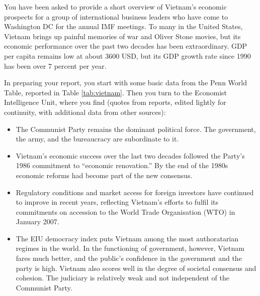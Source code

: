\documentclass[letterpaper,12pt]{exam}
\begin{document}
\begin{questions}
You have been asked to provide a short overview of Vietnam's economic prospects
for a group of international business leaders who have come to
Washington DC for the annual IMF meetings.
To many in the United States, Vietnam brings up painful memories of war and Oliver Stone movies,
but its economic performance over the past two decades has been extraordinary.
GDP per capita remains low at about 3600 USD,
but its GDP growth rate since 1990 has been over 7 percent per year.

In preparing your report,
you start with some basic data from the Penn World Table,
reported in Table \ref{tab:vietnam}.
Then you turn to the Economist Intelligence Unit,
where you find (quotes from reports, edited lightly for continuity,
with additional data from other sources):
\begin{itemize}
\item The Communist Party remains the dominant political force.
The government, the army, and the bureaucracy are subordinate to it.
\item Vietnam's economic success over the last two decades followed the Party's 1986
commitment to ``economic renovation.''
By the end of the 1980s economic reforms had become part of the new consensus.
\item Regulatory conditions and market access for foreign investors have continued to
improve in recent years, reflecting Vietnam's efforts to fulfil its commitments on
accession to the World Trade Organisation (WTO) in January 2007.


\item The EIU democracy index puts Vietnam among the most authoratarian
regimes in the world.
In the functioning of government, however, Vietnam fares much better,
and the public's confidence in the government and the party is high.
Vietnam also scores well in the degree of societal consensus and cohesion.
The judiciary is relatively weak and not independent of the
Communist Party.


\end{itemize}
\end{questions}
\end{document}
